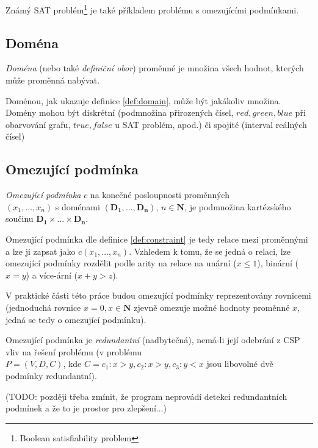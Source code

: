Známý SAT problém\footnote{Boolean satisfiability problem} je také příkladem problému s omezujícími podmínkami.

\subsection{Doména}
\begin{definition}
\label{def:domain}
\emph{Doména} (nebo také \emph{definiční obor}) proměnné je množina všech hodnot, kterých může proměnná nabývat.
\end{definition}

Doménou, jak ukazuje definice \ref{def:domain}, může být jakákoliv množina. Domény mohou být diskrétní (podmnožina přirozených čísel, ${red, green, blue}$ při obarvování grafu, ${true, false}$ u SAT problém, apod.) či spojité (interval reálných čísel)


\subsection{Omezující podmínka}
\begin{definition}
\label{def:constraint}
\emph{Omezující podmínka} $c$ na konečné posloupnosti proměnných\\$(x_1, \dots, x_n)$ s doménami $(\boldsymbol{D_1}, \dots, \boldsymbol{D_n})$, $n \in \boldsymbol{N}$, je podmnožina kartézského součinu $\boldsymbol{D_1} \times \dots \times \boldsymbol{D_n}$.
\end{definition}

Omezující podmínka dle definice \ref{def:constraint} je tedy relace mezi proměnnými a lze ji zapsat jako $c(x_1, \dots, x_n)$. Vzhledem k tomu, že se jedná o relaci, lze omezující podmínky rozdělit podle arity na relace na unární ($x \leq 1$), binární ($x = y$) a více-ární ($x + y > z $).

V praktické části této práce budou omezující podmínky reprezentovány rovnicemi (jednoduchá rovnice $x = 0, x \in \boldsymbol{N}$ zjevně omezuje možné hodnoty proměnné $x$, jedná se tedy o omezující podmínku).

Omezující podmínka je \emph{redundantní} (nadbytečná), nemá-li její odebrání z CSP vliv na řešení problému (v problému \\ $P = (V, D, C)$, kde $C = {c_1: x > y, c_2: x > y, c_3: y < x}$ jsou libovolné dvě podmínky redundantní).

(TODO: později třeba zmínit, že program neprovádí detekci redundantních podmínek a že to je prostor pro zlepšení...)

